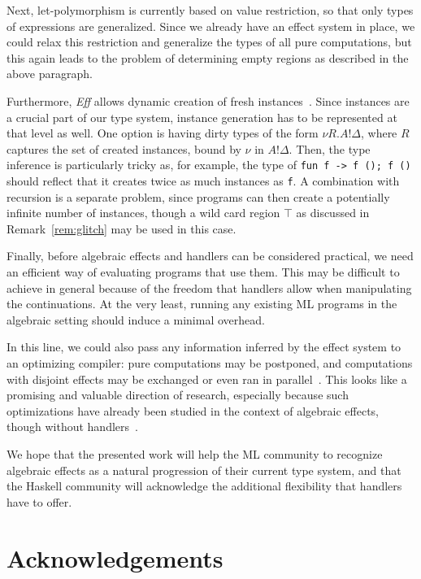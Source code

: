 \documentclass{LMCS}
\newcommand{\Drt}{\Delta}
\newcommand{\Rgn}{R}
\newcommand{\E}{\mathrel{!}}
\newcommand{\Eff}{\emph{Eff}\xspace}
\let\inline\lstinline
\begin{document}
Next, let-polymorphism is currently based on value restriction, so that only types of expressions are generalized.
Since we already have an effect system in place,
we could relax this restriction and generalize the types of all pure computations,
but this again leads to the problem of determining empty regions as described in the above paragraph.

Furthermore, \Eff allows dynamic creation of fresh instances~\cite{bauer2012programming}.
Since instances are a crucial part of our type system,
instance generation has to be represented at that level as well.
One option is having dirty types of the form $\nu \Rgn. A \E \Drt$,
where $\Rgn$ captures the set of created instances, bound by $\nu$ in $A \E \Drt$.
Then, the type inference is particularly tricky as,
for example, the type of \inline{fun f -> f (); f ()} should reflect that it creates twice as much instances as \inline{f}.
A combination with recursion is a separate problem,
since programs can then create a potentially infinite number of instances,
though a wild card region $\top$ as discussed in Remark~\ref{rem:glitch} may be used in this case.

Finally, before algebraic effects and handlers can be considered practical,
we need an efficient way of evaluating programs that use them.
This may be difficult to achieve in general because of the freedom that handlers allow when manipulating the continuations.
At the very least, running any existing ML programs in the algebraic setting should induce a minimal overhead.

In this line, we could also pass any information inferred by the effect system
to an optimizing compiler:
pure computations may be postponed,
and computations with disjoint effects may be exchanged or even ran in parallel~\cite{tolmach1998optimizing}.
This looks like a promising and valuable direction of research,
especially because such optimizations have already been studied in the context of algebraic effects,
though without handlers~\cite{kammar2012algebraic}.

We hope that the presented work will help the ML community to recognize
algebraic effects as a natural progression of their current type system,
and that the Haskell community will acknowledge the additional flexibility that handlers have to offer.


\section*{Acknowledgements}
\end{document}
